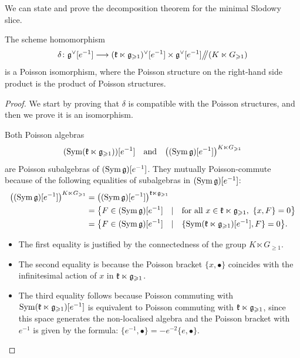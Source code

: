 We can state and prove the decomposition theorem for the minimal Slodowy slice.

\begin{theorem} \label{theorem:decomposition-slodowy}
	The scheme homomorphism
	\[ 	\delta \colon \mathfrak g^\vee[e^{-1}] \longrightarrow (\mathfrak k \ltimes \mathfrak g_{\geqslant 1})^\vee[e^{-1}] \times \mathfrak g^\vee[e^{-1}] \big/\!\!\big/ (K \ltimes G_{\geqslant 1}) \]
	is a Poisson isomorphism, where the Poisson structure on the right-hand side product is the product of Poisson structures.
\end{theorem}

\begin{proof}
	We start by proving that $\delta$ is compatible with the Poisson structures, and then we prove it is an isomorphism.
	
	Both Poisson algebras
	\[  (\operatorname{Sym}(\mathfrak k \ltimes \mathfrak g_{\geqslant 1}))[e^{-1}] \quad \text{and} \quad \big((\operatorname{Sym} \mathfrak g)[e^{-1}]\big)^{K \ltimes G_{\geqslant 1}} \]
	are Poisson subalgebras of $(\operatorname{Sym} \mathfrak g)[e^{-1}]$. They mutually Poisson-commute because of the following equalities of subalgebras in $(\operatorname{Sym} \mathfrak g)[e^{-1}]$:
	\[ \begin{aligned}
		\big((\operatorname{Sym} \mathfrak g)[e^{-1}]\big)^{K \ltimes G_{\geqslant 1}} & = \big((\operatorname{Sym} \mathfrak g)[e^{-1}]\big)^{\mathfrak k \ltimes \mathfrak g_{\geqslant 1}} \\
		& = \big\{ F \in (\operatorname{Sym} \mathfrak g)[e^{-1}] \quad | \quad \text{for all} ~  x \in \mathfrak k \ltimes \mathfrak g_{\geqslant 1},  ~   \{ x, F \} = 0 \big\} \\
		& = \big\{ F \in (\operatorname{Sym} \mathfrak g)[e^{-1}] \quad | \quad  \{\operatorname{Sym}(\mathfrak k \ltimes \mathfrak g_{\geqslant 1})[e^{-1}], F \} = 0\big\}. 
	\end{aligned} \]
	\begin{itemize}
		\item The first equality is justified by the connectedness of the group $K \ltimes G_{\geqslant 1}$. 
		\item The second equality is because the Poisson bracket $\{ x, \bullet \}$ coincides with the infinitesimal action of $x$ in $\mathfrak k \ltimes \mathfrak g_{\geqslant 1}$.
		
		\item The third equality follows because Poisson commuting with $\operatorname{Sym}(\mathfrak k \ltimes \mathfrak g_{\geqslant 1})[e^{-1}]$ is equivalent to Poisson commuting with $\mathfrak k \ltimes \mathfrak g_{\geqslant 1}$, since this space generates the non-localised algebra and the Poisson bracket with $e^{-1}$ is given by the formula: $\{e^{-1}, \bullet\} = - e^{-2} \{e, \bullet\}$.
	\end{itemize}
	

\end{proof}
